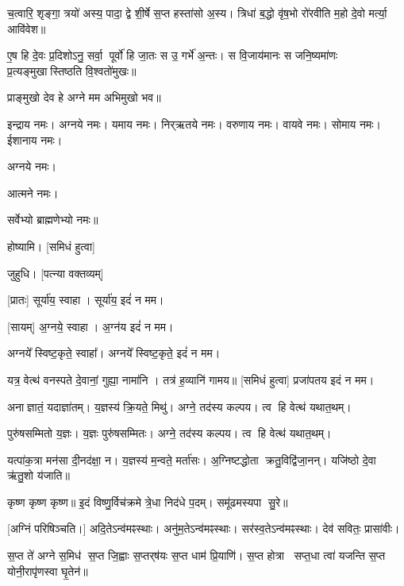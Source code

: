 
च॒त्वारि॒ शृङ्गा॒ त्रयो॑ अस्य॒ पादा॒ द्वे शी॒र्\mbox{}षे स॒प्त हस्ता॑सो अ॒स्य। त्रिधा॑ ब॒द्धो वृ॑ष॒भो रो॑रवीति म॒हो दे॒वो मर्त्या॒ आवि॑वेश॥

ए॒ष हि दे॒वः प्र॒दिशोऽनु॒ सर्वा॒ पूर्वो॑ हि जा॒तः स उ॒ गर्भे॑ अ॒न्तः। स वि॒जाय॑मानः स जनि॒ष्यमा॑णः प्र॒त्यङ्मुखास्तिष्ठति वि॒श्वतो॑मुखः॥ 

प्राङ्मुखो देव हे अग्ने मम अभिमुखो भव॥

इन्द्राय नमः। अग्नये नमः। यमाय नमः। निर्‌ऋतये नमः। 
वरुणाय नमः। वायवे नमः। सोमाय नमः। ईशानाय नमः। 

अग्नये नमः। 


आत्मने नमः। 

सर्वेभ्यो ब्राह्मणेभ्यो नमः॥


होष्यामि। [समिधं हुत्वा]

जुहुधि। [पत्न्या वक्तव्यम्]


[प्रातः] सूर्या॑य॒ स्वाहा। सूर्या॑य॒ इदं॑ न मम।

[सायम्] अ॒ग्नये॒ स्वाहा। अ॒ग्न॑य इदं॑ न मम।

अग्नये᳚ स्विष्ट॒कृते॒ स्वाहा᳚। अग्नये᳚ स्विष्ट॒कृते॒ इदं॑ न मम।


यत्र॒ वेत्थ॑ वनस्पते दे॒वानां॒ गुह्या॒ नामा॑नि । तत्र॑ ह॒व्यानि॑ गामय॥ [समिधं हुत्वा]
प्रजा॑पतय इदं न मम।


अनाज्ञातं॒ यदाज्ञा॑तम्। य॒ज्ञस्य॑ क्रि॒यते॒ मिथु॑।
अग्ने॒ तद॑स्य कल्पय। त्व हि वेत्थ॑ यथात॒थम्।

पुरु॑षसम्मितो य॒ज्ञः। य॒ज्ञः पुरु॑षसम्मितः।
अग्ने॒ तद॑स्य कल्पय। त्व हि वेत्थ॑ यथात॒थम्।

यत्पा॑क॒त्रा मन॑सा दी॒नद॑क्षा॒ न। य॒ज्ञस्य॑ म॒न्वते॒ मर्ता॑सः।
अ॒ग्निष्टद्धोता क्रतु॒विद्वि॑जा॒नन्। यजि॑ष्ठो दे॒वा ऋ॑तु॒शो य॑जाति॥

कृष्ण कृष्ण कृष्ण॥ इ॒दं विष्णु॒र्विच॑क्रमे त्रे॒धा निद॑धे प॒दम्। समू॑ढमस्यपा सु॒रे॥

[अग्निं परिषिञ्चति।]
अदि॒तेऽन्व॑मꣴस्थाः। अनु॑म॒तेऽन्व॑मꣴस्थाः। सर॑स्व॒तेऽन्व॑मꣴस्थाः। देव॑ सवितः॒ प्रासा॑वीः।

स॒प्त ते॑ अग्ने स॒मिध॑ स॒प्त जि॒ह्वाः स॒प्तर्‌ष॑यः स॒प्त धाम॑ प्रि॒याणि॑। स॒प्त होत्रा सप्त॒धा त्वा॑ यजन्ति स॒प्त योनी॒रापृ॑णस्वा घृ॒तेन॑॥


